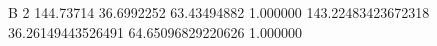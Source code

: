 


B		2
144.73714	36.6992252	63.43494882	1.000000
143.22483423672318	36.26149443526491	64.65096829220626	1.000000
